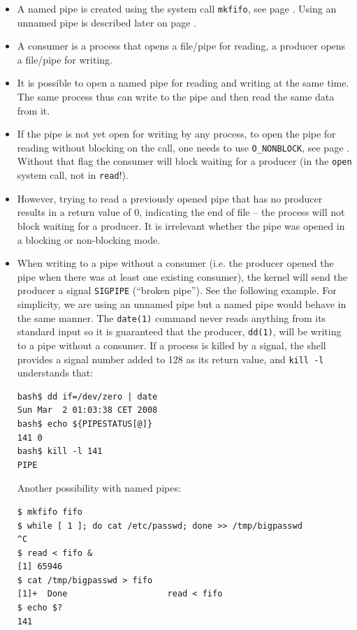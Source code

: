 \label{NAMEDPIPE}

\begin{itemize}
\item A named pipe is created using the system call \texttt{mkfifo}, see page
\pageref{MKFIFO}.  Using an unnamed pipe is described later on page
\pageref{PIPE}.
\item A consumer is a process that opens a file/pipe for reading, a producer
opens a file/pipe for writing.
\item It is possible to open a named pipe for reading and writing at the same
time.  The same process thus can write to the pipe and then read the same data
from it.
\item If the pipe is not yet open for writing by any process, to open the pipe
for reading without blocking on the call, one needs to use \texttt{O\_NONBLOCK},
see page \pageref{O_NONBLOCK}.  Without that flag the consumer will block
waiting for a producer (in the \texttt{open} system call, not in
\texttt{read}!).
\item However, trying to read a previously opened pipe that has no producer
results in a return value of 0, indicating the end of file -- the process will
not block waiting for a producer.  It is irrelevant whether the pipe was opened
in a blocking or non-blocking mode.
\item When writing to a pipe without a consumer (i.e. the producer opened the
pipe when there was at least one existing consumer), the kernel will send the
producer a signal \texttt{SIGPIPE} (``broken pipe'').  See the following
example.  For simplicity, we are using an unnamed pipe but a named pipe
would behave in the same manner.  The \texttt{date(1)} command never
reads anything from its standard input so it is guaranteed that the producer,
\texttt{dd(1)}, will be writing to a pipe without a consumer.  If a process is
killed by a signal, the shell provides a signal number added to 128 as its
return value, and \texttt{kill -l} understands that:

\begin{verbatim}
bash$ dd if=/dev/zero | date
Sun Mar  2 01:03:38 CET 2008
bash$ echo ${PIPESTATUS[@]}
141 0
bash$ kill -l 141
PIPE
\end{verbatim}

Another possibility with named pipes:

\begin{verbatim}
$ mkfifo fifo
$ while [ 1 ]; do cat /etc/passwd; done >> /tmp/bigpasswd
^C
$ read < fifo &
[1] 65946
$ cat /tmp/bigpasswd > fifo
[1]+  Done                    read < fifo
$ echo $?
141
\end{verbatim}


\end{itemize}
